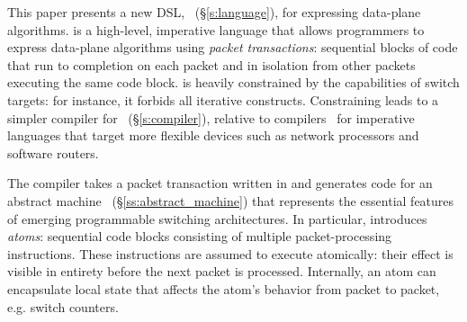 



This paper presents a new DSL, \pktlanguage~(\S\ref{s:language}), for
expressing data-plane algorithms. \pktlanguage is a high-level, imperative
language that allows programmers to express data-plane algorithms using {\em
packet transactions}: sequential blocks of code that run to completion on each
packet and in isolation from other packets executing the same code block.
\pktlanguage is heavily constrained by the capabilities of switch targets: for
instance, it forbids all iterative constructs. Constraining \pktlanguage leads
to a simpler compiler for \pktlanguage~(\S\ref{s:compiler}), relative to
compilers~\cite{ixp} for imperative languages that target more flexible devices
such as network processors and software routers.

The \pktlanguage compiler takes a packet transaction written in \pktlanguage
and generates code for an abstract machine
\absmachine~(\S\ref{ss:abstract_machine}) that represents the essential
features of emerging programmable switching architectures.  In particular,
\absmachine introduces \textit{atoms}: sequential code blocks consisting of
multiple packet-processing instructions. These instructions are assumed to
execute atomically: their effect is visible in entirety before the next packet
is processed. Internally, an atom can encapsulate local state that affects the
atom's behavior from packet to packet, e.g.  switch counters.

